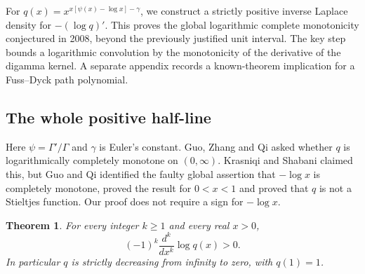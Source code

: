 \documentclass[11pt,a4paper]{article}
\numberwithin{equation}{section}
\newtheorem{theorem}{Theorem}[section]
\theoremstyle{definition}
\theoremstyle{remark}
\newenvironment{sectionabstract}{\par\smallskip\begingroup\small\noindent}{\par\endgroup\medskip}
\begin{document}
\begin{sectionabstract}
For $q(x)=x^{x[\psi(x)-\log x]-\gamma}$, we construct a strictly positive inverse Laplace density for $-(\log q)'$. This proves the global logarithmic complete monotonicity conjectured in 2008, beyond the previously justified unit interval. The key step bounds a logarithmic convolution by the monotonicity of the derivative of the digamma kernel. A separate appendix records a known-theorem implication for a Fuss--Dyck path polynomial.
\end{sectionabstract}
\subsection{The whole positive half-line}
Here $\psi=\Gamma'/\Gamma$ and $\gamma$ is Euler's constant. Guo, Zhang and Qi \cite[Remark 8, eq.~(21)]{r40heisei:gzq} asked whether $q$ is logarithmically completely monotone on $(0,\infty)$. Krasniqi and Shabani \cite{r40heisei:ks} claimed this, but Guo and Qi \cite[Theorem 1.1 and preceding discussion]{r40heisei:gq} identified the faulty global assertion that $-\log x$ is completely monotone, proved the result for $0<x<1$ and proved that $q$ is not a Stieltjes function. Our proof does not require a sign for $-\log x$.
\begin{theorem}
For every integer $k\ge1$ and every real $x>0$,
\[
(-1)^k\frac{d^k}{dx^k}\log q(x)>0.
\]
In particular $q$ is strictly decreasing from infinity to zero, with $q(1)=1$.
\end{theorem}
\end{document}
